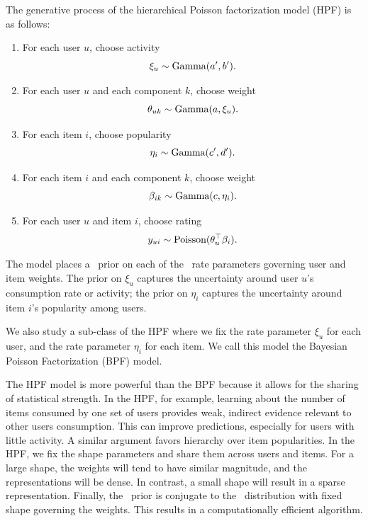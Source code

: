 \documentclass{sig-alternate}
\begin{document}
The generative process of the hierarchical Poisson factorization model
(HPF) is as follows:
\begin{enumerate}
\item For each user $u$, choose activity
  \begin{equation*}
    \xi_u \sim \textrm{Gamma}(a', b').
  \end{equation*}
\item For each user $u$ and each component $k$, choose weight
  \begin{equation*}
    \theta_{uk} \sim \textrm{Gamma}(a, \xi_u).
  \end{equation*}
\item For each item $i$, choose popularity
  \begin{equation*}
    \eta_i \sim \textrm{Gamma}(c', d').
  \end{equation*}
\item For each item $i$ and each component $k$, choose weight
  \begin{equation*}
    \beta_{ik} \sim \textrm{Gamma}(c, \eta_i).
  \end{equation*}
\item For each user $u$ and item $i$, choose rating
  \begin{equation*}
    y_{ui} \sim \textrm{Poisson}(\theta_u^\top \beta_i).
  \end{equation*}
\end{enumerate}
The model places a \gam~prior on each of the \gam~rate parameters
governing user and item weights. The prior on $\xi_u$ captures the
uncertainty around user $u$'s consumption rate or activity; the prior
on $\eta_i$ captures the uncertainty around item $i$'s popularity
among users. 

We also study a sub-class of the HPF where we fix the rate parameter
$\xi_u$ for each user, and the rate parameter $\eta_i$ for each
item. We call this model the Bayesian Poisson Factorization (BPF)
model.

The HPF model is more powerful than the BPF because it allows for the
sharing of statistical strength. In the HPF, for example, learning
about the number of items consumed by one set of users provides weak,
indirect evidence relevant to other users consumption. This can
improve predictions, especially for users with little activity. A
similar argument favors hierarchy over item popularities. In the HPF,
we fix the shape parameters and share them across users and items. For
a large shape, the weights will tend to have similar magnitude, and
the representations will be dense. In contrast, a small shape will
result in a sparse representation.  Finally, the \gam~prior is
conjugate to the \gam~distribution with fixed shape governing the
weights. This results in a computationally efficient algorithm.
\end{document}
